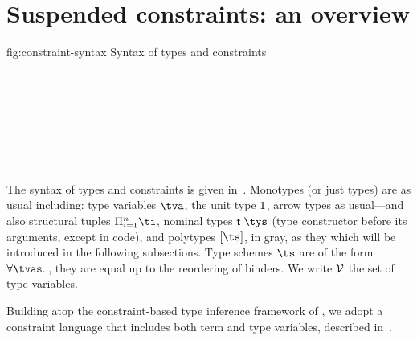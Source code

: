\documentclass[acmsmall,screen,nonacm,review]{acmart}
\begin{document}
\section{Suspended constraints: an overview}
\label{sec:constraints}

\begin{bnffig}[t]%
  {fig:constraint-syntax}%
  {Syntax of types and constraints}
\\
\entry[Types]{\t}{
    \tv \and
    \tunit \and
    \ta \to \tb \color{gray} \and
    \Pi\iton \ti \and
    \T \tys \and
    \tpoly \ts
}\\
\\[1ex]
\entry[Constraints]{\c}{
        \ctrue
  \and  \cfalse
  \and  \ca \cand \cb
  \and  \cexists \tv \c
  \and 	\cfor \tv \c
  \and  \cunif \ta \tb
  \nextline
  \and  \clet \x \tv \ca \cb
  \and  \capp \x \t
  \nextline
  \and  \cmatch \t \cbrs
}\\[1ex]
\entry[Branches]{\cbr}{\cbranch \cpat \c} \\
\entry[Patterns]{\cpat}{}{} \\[1ex]
 \\
\entry[Shapes] {\Sh} {} {}
\\
 {} {}
\end{bnffig}


The syntax of types and constraints is given
in~. Monotypes (or just types) are as
usual including: type variables $\tv$, the unit type $1$, arrow
types as usual---and also structural tuples $\Pi\iton \ti$, nominal
types $\T \tys$ (type constructor before its arguments, except in \OCaml code), and polytypes $\tpoly \ts$, in gray, as they which
will be introduced in the following subsections. Type schemes $\ts$
are of the form $\all \tvs \t$, they are equal up to the reordering of
binders. We write $\mathcal{V}$ the set of type variables.

Building atop the constraint-based type inference framework of
\citet{Pottier-Remy/emlti}, we adopt a constraint language that includes both
term and type variables, described in~.
\end{document}
